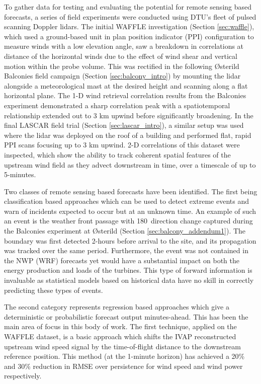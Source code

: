 To gather data for testing and evaluating the potential for remote sensing based forecasts, a series of field experiments were conducted using DTU's fleet of pulsed scanning Doppler lidars. The initial WAFFLE investigation (Section \ref{sec:waffle}), which used a ground-based unit in plan position indicator (PPI) configuration to measure winds with a low elevation angle, saw a breakdown in correlations at distance of the horizontal winds due to the effect of wind shear and vertical motion within the probe volume. This was rectified in the following {\O}sterild Balconies field campaign (Section \ref{sec:balcony_intro}) by mounting the lidar alongside a meteorological mast at the desired height and scanning along a flat horizontal plane. The 1-D wind retrieval correlation results from the Balconies experiment demonstrated a sharp correlation peak with a spatiotemporal relationship extended out to 3 km upwind before significantly broadening. In the final LASCAR field trial (Section \ref{sec:lascar_intro}), a similar setup was used where the lidar was deployed on the roof of a building and performed flat, rapid PPI scans focusing up to 3 km upwind. 2-D correlations of this dataset were inspected, which show the ability to track coherent spatial features of the upstream wind field as they advect downstream in time, over a timescale of up to 5-minutes.

Two classes of remote sensing based forecasts have been identified. The first being classification based approaches which can be used to detect extreme events and warn of incidents expected to occur but at an unknown time. An example of such an event is the weather front passage with 180\degree \ direction change captured during the Balconies experiment at {\O}sterild (Section \ref{sec:balcony_addendum1}). The boundary was first detected 2-hours before arrival to the site, and its propagation was tracked over the same period. Furthermore, the event was not contained in the NWP (WRF) forecasts yet would have a substantial impact on both the energy production and loads of the turbines. This type of forward information is invaluable as statistical models based on historical data have no skill in correctly predicting these types of events.

The second category represents regression based approaches which give a deterministic or probabilistic forecast output minutes-ahead. This has been the main area of focus in this body of work. The first technique, applied on the WAFFLE dataset, is a basic approach which shifts the IVAP reconstructed upstream wind speed signal by the time-of-flight distance to the downstream reference position. This method (at the 1-minute horizon) has achieved a 20\% and 30\% reduction in RMSE over persistence for wind speed and wind power respectively. 

